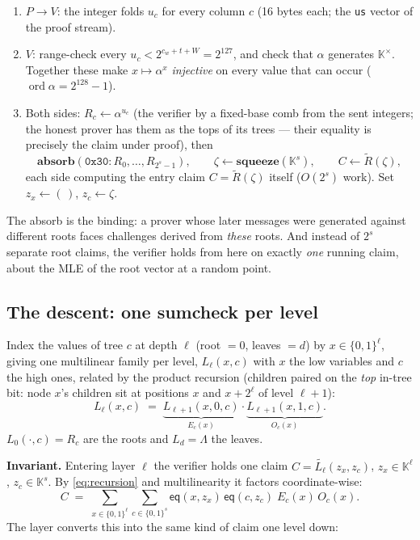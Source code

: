 \documentclass[11pt]{article}
\newcommand{\K}{\mathbb{K}}            %
\newcommand{\Kx}{\K^{\times}}
\newcommand{\bits}{\{0,1\}}
\newcommand{\mle}[1]{\widetilde{#1}}
\newcommand{\eq}{\mathsf{eq}}
\newcommand{\cw}{c_w}
\newcommand{\absorb}{\textbf{absorb}}
\newcommand{\squeeze}{\textbf{squeeze}}
\newcommand{\code}[1]{{\def\_{\textunderscore\allowbreak}\texttt{#1}}}
\theoremstyle{definition}
\begin{document}
\begin{enumerate}[leftmargin=2.2em, itemsep=2pt]
\item $P \to V$: the integer folds $u_c$ for every column $c$
  (16 bytes each; the \code{us} vector of the proof stream).
\item $V$: range-check every $u_c < 2^{\cw + t + W} = 2^{127}$, and
  check that $\alpha$ generates $\Kx$.  Together these make
  $x \mapsto \alpha^x$ \emph{injective} on every value that can occur
  ($\operatorname{ord} \alpha = 2^{128} - 1$).
\item Both sides: $R_c \leftarrow \alpha^{u_c}$ (the verifier by a
  fixed-base comb from the sent integers; the honest prover has them as
  the tops of its trees --- their equality is precisely the claim under
  proof), then
  \[
    \absorb(\mathtt{0x30}: R_0, \dots, R_{2^s-1}), \qquad
    \zeta \leftarrow \squeeze(\K^s), \qquad
    C \leftarrow \mle{R}(\zeta),
  \]
  each side computing the entry claim $C = \mle{R}(\zeta)$ itself
  ($O(2^s)$ work).  Set $z_x \leftarrow (\,)$, $z_c \leftarrow \zeta$.
\end{enumerate}

The absorb is the binding: a prover whose later messages were generated
against different roots faces challenges derived from \emph{these}
roots.  And instead of $2^s$ separate root claims, the verifier holds
from here on exactly \emph{one} running claim, about the MLE of the root
vector at a random point.

\subsection{The descent: one sumcheck per level}
\label{sec:descent}

Index the values of tree $c$ at depth $\ell$ (root $= 0$, leaves $= d$)
by $x \in \bits^\ell$, giving one multilinear family per level,
$L_\ell(x, c)$ with $x$ the low variables and $c$ the high ones, related
by the product recursion (children paired on the \emph{top} in-tree
bit: node $x$'s children sit at positions $x$ and $x + 2^\ell$ of level
$\ell+1$):
\begin{equation}\label{eq:recursion}
  L_\ell(x, c) \;=\;
  \underbrace{L_{\ell+1}(x, 0, c)}_{E_c(x)} \cdot
  \underbrace{L_{\ell+1}(x, 1, c)}_{O_c(x)}.
\end{equation}
$L_0(\cdot, c) = R_c$ are the roots and $L_d = \Lambda$ the leaves.

\medskip
\noindent
\textbf{Invariant.}  Entering layer $\ell$ the verifier holds one claim
$C = \mle{L_\ell}(z_x, z_c)$, $z_x \in \K^\ell$, $z_c \in \K^s$.  By
\eqref{eq:recursion} and multilinearity it factors coordinate-wise:
\begin{equation}\label{eq:layer}
  C \;=\; \sum_{x \in \bits^\ell} \sum_{c \in \bits^s}
     \eq(x, z_x)\,\eq(c, z_c)\; E_c(x)\, O_c(x).
\end{equation}
The layer converts this into the same kind of claim one level down:
\end{document}
